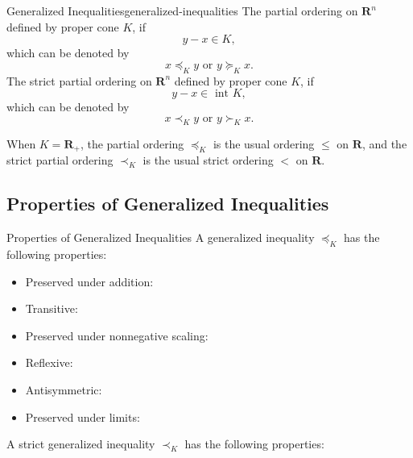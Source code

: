 \begin{definition}{Generalized Inequalities}{generalized-inequalities}
    The partial ordering on $\mathbf{R}^n$ defined by proper cone $K$, if
    \begin{equation}
        y-x\in K,
    \end{equation}
    which can be denoted by
    \begin{equation}
        x\preceq_{K}y\text{ or }y\succeq_{K}x.
    \end{equation}
    The strict partial ordering on $\mathbf{R}^n$ defined by proper cone $K$, if
    \begin{equation}
        y-x\in\text{ int }K,
    \end{equation}
    which can be denoted by
    \begin{equation}
        x\prec_{K}y\text{ or }y\succ_{K}x.
    \end{equation}
\end{definition}

\begin{note}
    When $K=\mathbf{R}_{+}$, the partial ordering $\preceq_{K}$ is the usual ordering $\leq$ on $\mathbf{R}$, and the strict partial ordering $\prec_{K}$ is the usual strict ordering $<$ on $\mathbf{R}$.
\end{note}

\subsection{Properties of Generalized Inequalities}

\begin{theorem}{Properties of Generalized Inequalities}{}
    A generalized inequality $\preceq_{K}$ has the following properties:
    \begin{itemize}
        \item Preserved under addition:
        \item Transitive:
        \item Preserved under nonnegative  scaling:
        \item Reflexive:
        \item Antisymmetric:
        \item Preserved under limits:
    \end{itemize}
    A strict generalized inequality $\prec_{K}$ has the following properties:
\end{theorem}
